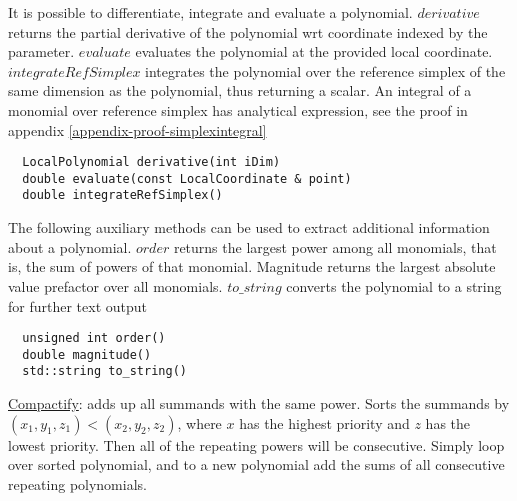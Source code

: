 \noindent
It is possible to differentiate, integrate and evaluate a polynomial. $derivative$ returns the partial derivative of the polynomial wrt coordinate indexed by the parameter. $evaluate$ evaluates the polynomial at the provided local coordinate. $integrateRefSimplex$ integrates the polynomial over the reference simplex of the same dimension as the polynomial, thus returning a scalar. An integral of a monomial over reference simplex has analytical expression, see the proof in appendix \ref{appendix-proof-simplexintegral}  \\


\begin{mybox}
\begin{lstlisting}
  LocalPolynomial derivative(int iDim)
  double evaluate(const LocalCoordinate & point)
  double integrateRefSimplex()
\end{lstlisting}
\end{mybox}


\noindent
The following auxiliary methods can be used to extract additional information about a polynomial. $order$ returns the largest power among all monomials, that is, the sum of powers of that monomial. Magnitude returns the largest absolute value prefactor over all monomials. $to\_string$ converts the polynomial to a string for further text output \\

\begin{mybox}
\begin{lstlisting}
  unsigned int order()
  double magnitude()
  std::string to_string()
\end{lstlisting}
\end{mybox}


\noindent
\uline{Compactify}: adds up all summands with the same power. Sorts the summands by $(x_1,y_1,z_1) < (x_2, y_2, z_2)$, where $x$ has the highest priority and $z$ has the lowest priority. Then all of the repeating powers will be consecutive. Simply loop over sorted polynomial, and to a new polynomial add the sums of all consecutive repeating polynomials.



